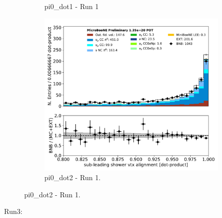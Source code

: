 \documentclass[a4paper]{article}
\begin{document}
\begin{figure}[H]
\begin{center}
\begin{subfigure}[b]{0.3\textwidth}
    \caption{\label{fig:pi0:inputs:dot1:RUN1} pi0\_dot1 - Run 1 }
    \end{subfigure}
    \begin{subfigure}[b]{0.3\textwidth}
    \centering
    \includegraphics[width=1.00\textwidth]{pi0/pi0_dot2_01152020_inputs_RUN1.pdf}
    \caption{\label{fig:pi0:inputs:dot2:RUN1} pi0\_dot2 - Run 1.}
    \end{subfigure}
\end{center}
\end{figure}

\par Run3:
\end{document}

